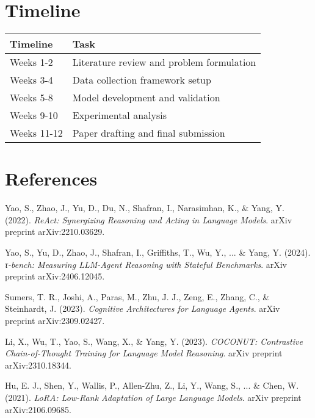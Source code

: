 \documentclass[11pt]{article}
\begin{document}
\section{Timeline}
\begin{tabular}{@{}ll@{}}
\toprule
\textbf{Timeline} & \textbf{Task} \\ 
\midrule
Weeks 1-2 & Literature review and problem formulation \\
Weeks 3-4 & Data collection framework setup \\
Weeks 5-8 & Model development and validation \\
Weeks 9-10 & Experimental analysis \\
Weeks 11-12 & Paper drafting and final submission \\
\bottomrule
\end{tabular}

\section{References}

\begin{thebibliography}{9}

Yao, S., Zhao, J., Yu, D., Du, N., Shafran, I., Narasimhan, K., \& Yang, Y. (2022).
\textit{ReAct: Synergizing Reasoning and Acting in Language Models}.
arXiv preprint arXiv:2210.03629.

Yao, S., Yu, D., Zhao, J., Shafran, I., Griffiths, T., Wu, Y., ... \& Yang, Y. (2024).
\textit{τ-bench: Measuring LLM-Agent Reasoning with Stateful Benchmarks}.
arXiv preprint arXiv:2406.12045.

Sumers, T. R., Joshi, A., Paras, M., Zhu, J. J., Zeng, E., Zhang, C., \& Steinhardt, J. (2023).
\textit{Cognitive Architectures for Language Agents}.
arXiv preprint arXiv:2309.02427.

Li, X., Wu, T., Yao, S., Wang, X., \& Yang, Y. (2023).
\textit{COCONUT: Contrastive Chain-of-Thought Training for Language Model Reasoning}.
arXiv preprint arXiv:2310.18344.

Hu, E. J., Shen, Y., Wallis, P., Allen-Zhu, Z., Li, Y., Wang, S., ... \& Chen, W. (2021).
\textit{LoRA: Low-Rank Adaptation of Large Language Models}.
arXiv preprint arXiv:2106.09685.

\end{thebibliography}

\hypersetup{
    linkcolor=blue,
    citecolor=red,
    urlcolor=magenta
}
\end{document}
